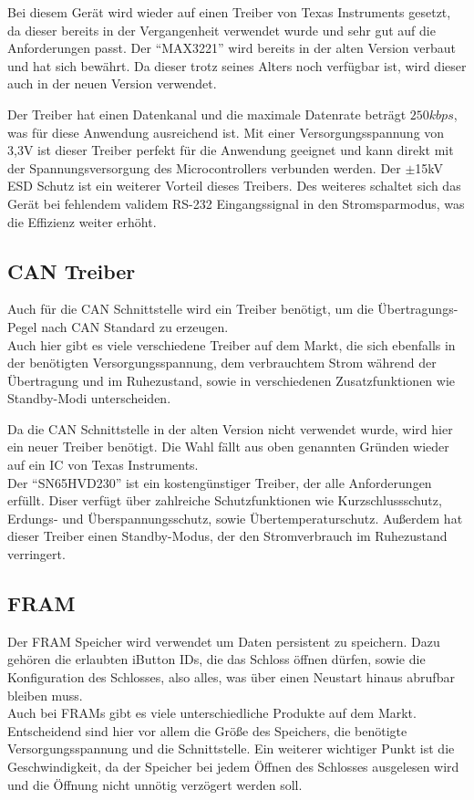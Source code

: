 Bei diesem Gerät wird wieder auf einen Treiber von Texas Instruments gesetzt, da dieser bereits in der Vergangenheit
verwendet wurde und sehr gut auf die Anforderungen passt. Der \enquote{MAX3221} wird bereits in der alten Version
verbaut und hat sich bewährt. Da dieser trotz seines Alters noch verfügbar ist, wird dieser auch in der neuen Version
verwendet.

Der Treiber hat einen Datenkanal und die maximale Datenrate beträgt \(250 kbps\), was für diese Anwendung ausreichend ist.
Mit einer Versorgungsspannung von 3,3V ist dieser Treiber perfekt für die Anwendung geeignet und kann direkt mit der
Spannungsversorgung des Microcontrollers verbunden werden. Der \(\pm\)15kV \ac{ESD} Schutz ist ein weiterer Vorteil
dieses Treibers. Des weiteres schaltet sich das Gerät bei fehlendem validem RS-232 Eingangssignal in den Stromsparmodus,
was die Effizienz weiter erhöht.

\subsection{\ac{CAN} Treiber}
Auch für die \ac{CAN} Schnittstelle wird ein Treiber benötigt, um die Übertragungs-Pegel nach \ac{CAN} Standard zu
erzeugen. \\
Auch hier gibt es viele verschiedene Treiber auf dem Markt, die sich ebenfalls in der benötigten Versorgungsspannung,
dem verbrauchtem Strom während der Übertragung und im Ruhezustand, sowie in verschiedenen Zusatzfunktionen wie Standby-Modi
unterscheiden.

Da die \ac{CAN} Schnittstelle in der alten Version nicht verwendet wurde, wird hier ein neuer Treiber benötigt.
Die Wahl fällt aus oben genannten Gründen wieder auf ein \ac{IC} von Texas Instruments. \\
Der \enquote{SN65HVD230} ist ein kostengünstiger Treiber, der alle Anforderungen erfüllt. Diser verfügt über zahlreiche
Schutzfunktionen wie Kurzschlussschutz, Erdungs- und Überspannungsschutz, sowie Übertemperaturschutz. Außerdem hat
dieser Treiber einen Standby-Modus, der den Stromverbrauch im Ruhezustand verringert.

\subsection{\ac{FRAM}}
Der \ac{FRAM} Speicher wird verwendet um Daten persistent zu speichern. Dazu gehören die erlaubten iButton IDs, die
das Schloss öffnen dürfen, sowie die Konfiguration des Schlosses, also alles, was über einen Neustart hinaus abrufbar
bleiben muss. \\
Auch bei \acp{FRAM} gibt es viele unterschiedliche Produkte auf dem Markt. Entscheidend sind hier vor allem die Größe
des Speichers, die benötigte Versorgungsspannung und die Schnittstelle. Ein weiterer wichtiger Punkt ist die
Geschwindigkeit, da der Speicher bei jedem Öffnen des Schlosses ausgelesen wird und die Öffnung nicht unnötig
verzögert werden soll.

